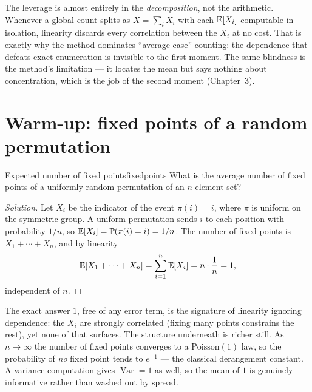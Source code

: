 \begin{insight}
The leverage is almost entirely in the \emph{decomposition}, not the
arithmetic. Whenever a global count splits as $X=\sum_i X_i$ with each
$\mathbb{E}[X_i]$ computable in isolation, linearity discards every correlation
between the $X_i$ at no cost. That is exactly why the method dominates
``average case'' counting: the dependence that defeats exact enumeration is
invisible to the first moment. The same blindness is the method's limitation
--- it locates the mean but says nothing about concentration, which is the
job of the second moment (Chapter~3).
\end{insight}

\section{Warm-up: fixed points of a random permutation}

\begin{question}{Expected number of fixed points}{fixedpoints}
What is the average number of fixed points of a uniformly random permutation
of an $n$-element set?
\end{question}

\begin{proof}[Solution]
Let $X_i$ be the indicator of the event $\pi(i)=i$, where $\pi$ is uniform on
the symmetric group. A uniform permutation sends $i$ to each position with
probability $1/n$, so $\mathbb{E}[X_i]=\mathbb{P}(\pi(i)=i)=1/n$. The number of fixed
points is $X_1+\cdots+X_n$, and by linearity
\[
  \mathbb{E}[X_1+\cdots+X_n] = \sum_{i=1}^n \mathbb{E}[X_i] = n\cdot\frac1n = 1,
\]
independent of $n$.
\end{proof}

\begin{insight}
The exact answer $1$, free of any error term, is the signature of linearity
ignoring dependence: the $X_i$ are strongly correlated (fixing many points
constrains the rest), yet none of that surfaces. The structure underneath is
richer still. As $n\to\infty$ the number of fixed points converges to a
$\mathrm{Poisson}(1)$ law, so the probability of \emph{no} fixed point tends
to $e^{-1}$ --- the classical derangement constant. A variance computation
gives $\operatorname{Var}=1$ as well, so the mean of $1$ is genuinely
informative rather than washed out by spread.
\end{insight}

